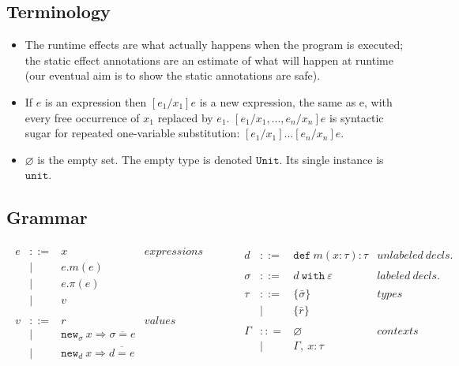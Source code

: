 \documentclass{llncs}
\newcommand{\keywadj}[1]{\mathtt{#1}}
\newcommand{\keyw}[1]{\keywadj{#1}~}
\begin{document}
\subsection{Terminology}

\begin{itemize}
	\item The runtime effects are what actually happens when the program is executed; the static effect annotations are an estimate of what will happen at runtime (our eventual aim is to show the static annotations are safe).
	\item If $e$ is an expression then $[e_1/x_1]e$ is a new expression, the same as e, with every free occurrence of $x_1$ replaced by $e_1$. $[e_1/x_1, ..., e_n/x_n]e$ is syntactic sugar for repeated one-variable substitution: $[e_1/x_1]...[e_n/x_n]e$.
	\item $\varnothing$ is the empty set. The empty type is denoted $\keywadj{Unit}$. Its single instance is $\keywadj{unit}$.
\end{itemize}

\subsection{Grammar}

\[
\begin{array}{lll}
\begin{array}{lllr}
	e & ::= & x & expressions \\
  		& | & e.m(e)\\
  		& | & e.\pi(e)\\
		& | & v \\
		&&\\
		
	v & ::= & r & values \\
  		& | & \keywadj{new}_{\sigma}~x \Rightarrow \overline{\sigma = e} \\
  		& | & \keywadj{new}_d~x \Rightarrow \overline{d = e} \\
		&&\\

\end{array}
& ~~~~~~
&

\begin{array}{lllr}

	d & ::= & \keyw{def} m(x:\tau):\tau & unlabeled~decls.\\		&&\\
		
	\sigma & ::= & d~\keyw{with}\varepsilon  & labeled~ decls.\\
		&&\\
	\tau & ::= & \{ \bar \sigma \}  & types \\
		& | & \{ \bar r \} \\
		&&\\

	\Gamma & :: = & \varnothing & contexts\\
		& | & \Gamma,~x : \tau\\
		&&\\

&&\\

\end{array}
\end{array}
\]
\end{document}
